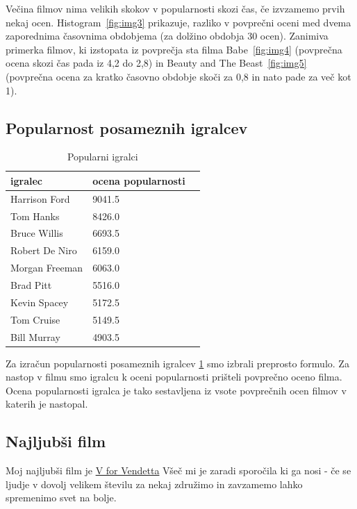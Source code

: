 \documentclass[a4paper,11pt]{article}
\begin{document}
Večina filmov nima velikih skokov v popularnosti skozi čas, če izvzamemo
prvih nekaj ocen. Histogram~\ref{fig:img3} prikazuje, razliko v povprečni
oceni med dvema zaporednima časovnima obdobjema (za dolžino obdobja 30 ocen).
Zanimiva primerka filmov, ki izstopata iz povprečja sta filma Babe~\ref{fig:img4} (povprečna
ocena skozi čas pada iz 4,2 do 2,8) in Beauty and The Beast~\ref{fig:img5} (povprečna
ocena za kratko časovno obdobje skoči za 0,8 in nato pade za več kot 1).


\subsection{Popularnost posameznih igralcev}


\begin{table}[htbp]
\caption{Popularni igralci}
\label{tab3}
\begin{center}
\begin{tabular}{llp{3cm}}
\hline
igralec & ocena popularnosti \\
\hline
Harrison Ford & 9041.5 \\
Tom Hanks & 8426.0 \\
Bruce Willis & 6693.5 \\
Robert De Niro & 6159.0 \\
Morgan Freeman & 6063.0 \\
Brad Pitt & 5516.0 \\
Kevin Spacey & 5172.5 \\
Tom Cruise & 5149.5 \\
Bill Murray & 4903.5 \\
\hline
\end{tabular}
\end{center}
\end{table}

Za izračun popularnosti posameznih igralcev \ref{tab3} smo izbrali preprosto
formulo. Za nastop v filmu smo igralcu k oceni popularnosti prišteli povprečno
oceno filma. Ocena popularnosti igralca je tako sestavljena iz vsote povprečnih
ocen filmov v katerih je nastopal.

\subsection{Najljubši film}
Moj najljubši film je \href{http://www.imdb.com/title/tt0434409/}{V for Vendetta}
Všeč mi je zaradi sporočila ki ga nosi - če se ljudje v dovolj velikem številu
za nekaj združimo in zavzamemo lahko spremenimo svet na bolje. 
\end{document}
